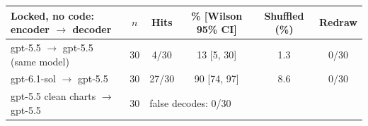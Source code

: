\begin{tabular}{lccccc}
\toprule
Locked, no code: encoder $\to$ decoder & $n$ & Hits & \% [Wilson 95\% CI] & Shuffled (\%) & Redraw \\
\midrule
gpt-5.5 $\to$ gpt-5.5 (same model) & 30 & 4/30 & 13 [5, 30] & 1.3 & 0/30 \\
gpt-6.1-sol $\to$ gpt-5.5 & 30 & 27/30 & 90 [74, 97] & 8.6 & 0/30 \\
gpt-5.5 clean charts $\to$ gpt-5.5 & 30 & \multicolumn{4}{l}{false decodes: 0/30} \\
\bottomrule
\end{tabular}
